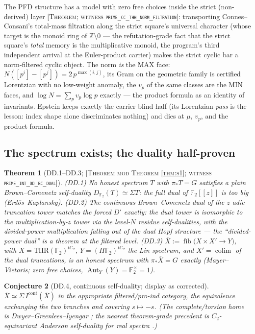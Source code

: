 \documentclass[11pt,reqno]{amsart}
\theoremstyle{plain}
\newtheorem{theorem}{Theorem}[section]
\newtheorem{conjecture}[theorem]{Conjecture}
\theoremstyle{definition}
\theoremstyle{remark}
\newcommand{\Z}{\mathbb{Z}}
\newcommand{\F}{\mathbb{F}}
\newcommand{\THR}{\mathrm{THR}}
\newcommand{\Xbar}{\overline{X}}
\newcommand{\grade}[1]{\textup{[\textsc{#1}]}}
\DeclareMathOperator{\Aut}{Aut}
\DeclareMathOperator{\fib}{fib}
\DeclareMathOperator{\colim}{colim}
\begin{document}
The PFD structure has a model with zero free choices inside the strict (non-derived) layer
\grade{Theorem; witness \texttt{prime\_\allowbreak cc\_\allowbreak thh\_\allowbreak norm\_\allowbreak filtration}}:
transporting Connes--Consani's total-mass filtration along the strict square's universal
character (whose target is the monoid ring of $\Z\setminus 0$ --- the refutation-grade fact
that the strict square's \emph{total} memory is the multiplicative monoid, the program's
third independent arrival at the Euler-product carrier) makes the strict cyclic bar a
norm-filtered cyclic object. The norm \emph{is} the MAX face:
$N([p^i] - [p^j]) = 2\,p^{\max(i,j)}$, its Gram on the geometric family is certified
Lorentzian with no low-weight anomaly, the $v_p$ of the same classes are the MIN faces, and
$\log N = \sum_p v_p \log p$ exactly --- the product formula as an identity of invariants.
Epstein keeps exactly the carrier-blind half (its Lorentzian \emph{pass} is the lesson:
index shape alone discriminates nothing) and dies at $\mu$, $v_p$, and the product formula.

\subsection{The spectrum exists; the duality half-proven}

\begin{theorem}[DD.1--DD.3; \grade{Theorem mod Theorem \ref{thm:s1}; witness
\texttt{prime\_\allowbreak int\_\allowbreak dd\_\allowbreak bc\_\allowbreak dual}}]\label{thm:dd}
\textup{(DD.1)} No honest spectrum $T$ with $\pi_* T = G$ satisfies a plain Brown--Comenetz
self-duality $D_{\F_2}(T) \simeq \Sigma T$: the full dual of $\F_2[[z]]$ is too big
(Erd\H{o}s--Kaplansky).
\textup{(DD.2)} The continuous Brown--Comenetz dual of the $z$-adic truncation tower matches
the forced $D'$ exactly: the dual tower is isomorphic to the multiplication-by-$z$ tower via
the level-$N$ residue self-dualities, with the divided-power multiplication falling out of
the dual Hopf structure --- the ``divided-power dual'' is a theorem at the filtered level.
\textup{(DD.3)} $\Xbar := \fib\bigl(X \times X' \to Y\bigr)$, with
$X = \THR(\F_2)^{tC_2}$, $Y = (H\F_2)^{tC_2}$ the Lin spectrum, and
$X' = \colim$ of the dual truncations, is an honest spectrum with $\pi_* \Xbar = G$ exactly
(Mayer--Vietoris; zero free choices, $\Aut_Y(Y) = \F_2^\times = 1$).
\end{theorem}

\begin{conjecture}[DD.4, continuous self-duality; display as corrected]\label{conj:dd4}
$\Xbar \simeq \Sigma\, I^{\mathrm{cont}}(\Xbar)$ in the appropriate filtered/pro-ind
category, the equivalence exchanging the two branches and covering $s \mapsto -s$. (The
complete/torsion home is Dwyer--Greenlees--Iyengar \cite{DGI06}; the nearest theorem-grade
precedent is $C_2$-equivariant Anderson self-duality for real spectra
\cite{GreenleesMeier17}.)
\end{conjecture}
\end{document}
